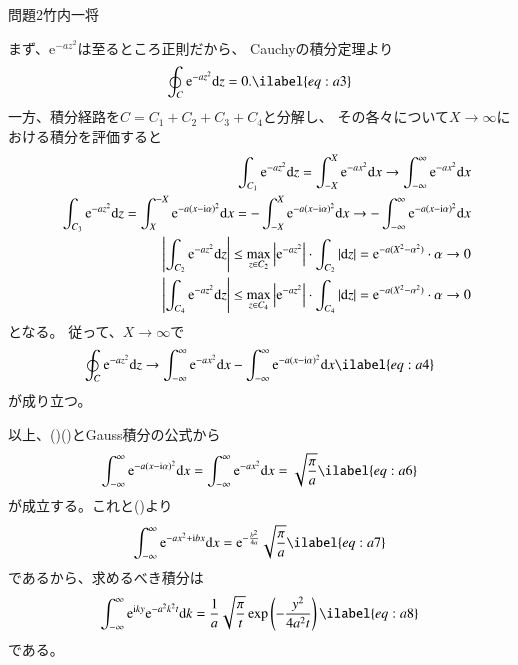 \documentclass[fleqn]{jbook}
\begin{document}
\begin{answer}{問題2}{竹内一将}
\begin{enumerate}
まず、$\mathrm{e}^{-az^2}$は至るところ正則だから、
Cauchyの積分定理より
\begin{eqnarray}
 \oint_C \mathrm{e}^{-a z^2} \mathrm{d} z = 0.  \ilabel{eq:a3}
\end{eqnarray}
一方、積分経路を$C=C_1+C_2+C_3+C_4$と分解し、
その各々について$X \to \infty$における積分を評価すると
\begin{eqnarray}
 && \int_{C_1} \mathrm{e}^{-az^2} \mathrm{d} z = \int_{-X}^X \mathrm{e}^{-ax^2} \mathrm{d} x \to \int_{-\infty}^\infty \mathrm{e}^{-ax^2} \mathrm{d} x
  \notag \\
 && \int_{C_3} \mathrm{e}^{-az^2} \mathrm{d} z = \int_X^{-X} \mathrm{e}^{-a(x-\mathrm{i}\alpha)^2} \mathrm{d} x = -\int_{-X}^X \mathrm{e}^{-a(x-\mathrm{i}\alpha)^2} \mathrm{d} x \to -\int_{-\infty}^\infty \mathrm{e}^{-a(x-\mathrm{i}\alpha)^2} \mathrm{d} x  \notag \\
 && \left| \int_{C_2} \mathrm{e}^{-az^2} \mathrm{d} z \right| \leq \max_{z \in C_2} \left| \mathrm{e}^{-az^2} \right| \cdot \int_{C_2} \left| \mathrm{d} z \right| = \mathrm{e}^{-a(X^2 - \alpha^2)} \cdot \alpha \to 0  \notag \\
 && \left| \int_{C_4} \mathrm{e}^{-az^2} \mathrm{d} z \right| \leq \max_{z \in C_4} \left| \mathrm{e}^{-az^2} \right| \cdot \int_{C_4} \left| \mathrm{d} z \right| = \mathrm{e}^{-a(X^2 - \alpha^2)} \cdot \alpha \to 0  \notag
\end{eqnarray}
となる。
従って、$X \to \infty$で
\begin{eqnarray}
 \oint_C \mathrm{e}^{-az^2} \mathrm{d} z
 \to \int_{-\infty}^\infty \mathrm{e}^{-ax^2} \mathrm{d} x - \int_{-\infty}^\infty \mathrm{e}^{-a(x-\mathrm{i}\alpha)^2} \mathrm{d} x  \ilabel{eq:a4}
\end{eqnarray}
が成り立つ。

以上、()()とGauss積分の公式から
\begin{eqnarray}
 \int_{-\infty}^\infty \mathrm{e}^{-a(x-\mathrm{i}\alpha)^2} \mathrm{d} x
 = \int_{-\infty}^\infty \mathrm{e}^{-ax^2} \mathrm{d} x = \sqrt{\frac{\pi}{a}}  \ilabel{eq:a6}
\end{eqnarray}
が成立する。これと()より
\begin{eqnarray}
 \int_{-\infty}^\infty \mathrm{e}^{-ax^2 + \mathrm{i} bx} \mathrm{d} x = \mathrm{e}^{-\frac{b^2}{4a}} \sqrt{\frac{\pi}{a}}  \ilabel{eq:a7}
\end{eqnarray}
であるから、求めるべき積分は
\begin{eqnarray}
 \int_{-\infty}^\infty \mathrm{e}^{\mathrm{i} ky} \mathrm{e}^{-a^2 k^2 t} \mathrm{d} k
 = \frac{1}{a} \sqrt{\frac{\pi}{t}} \exp \left( -\frac{y^2}{4a^2 t} \right)
  \ilabel{eq:a8}
\end{eqnarray}
である。


\end{enumerate}
\end{answer}
\end{document}
